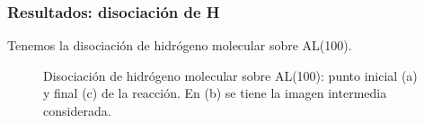 \subsubsection{Resultados: disociación de H}

  Tenemos la disociación de hidrógeno molecular sobre AL(100).

  \begin{figure}[H]
      \centering
       \caption{Disociación de hidrógeno molecular sobre AL(100): punto inicial (a) y final (c) de la reacción. En (b) se tiene la imagen intermedia considerada.}
   \end{figure}

